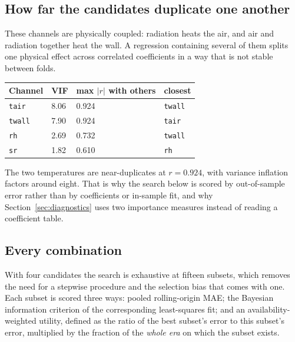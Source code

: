 \documentclass[11pt,a4paper]{article}
\begin{document}
\subsection{How far the candidates duplicate one another}
\label{sec:collinearity}

These channels are physically coupled: radiation heats the air, and air and
radiation together heat the wall. A regression containing several of them splits
one physical effect across correlated coefficients in a way that is not stable
between folds.

\begin{center}
\small
\begin{tabular}{lR{1.6cm}R{2.6cm}l}
\toprule
\textbf{Channel} & \textbf{VIF} & \textbf{max $|r|$ with others} &
\textbf{closest} \\
\midrule
\texttt{tair}  & 8.06 & 0.924 & \texttt{twall} \\
\texttt{twall} & 7.90 & 0.924 & \texttt{tair} \\
\texttt{rh}    & 2.69 & 0.732 & \texttt{twall} \\
\texttt{sr}    & 1.82 & 0.610 & \texttt{rh} \\
\bottomrule
\end{tabular}
\end{center}

The two temperatures are near-duplicates at $r = 0.924$, with variance inflation
factors around eight. That is why the search below is scored by out-of-sample
error rather than by coefficients or in-sample fit, and why
Section~\ref{sec:diagnostics} uses two importance measures instead of reading a
coefficient table.

\subsection{Every combination}

With four candidates the search is exhaustive at fifteen subsets, which removes
the need for a stepwise procedure and the selection bias that comes with one.
Each subset is scored three ways: pooled rolling-origin MAE; the Bayesian
information criterion of the corresponding least-squares fit; and an
availability-weighted utility, defined as the ratio of the best subset's error to
this subset's error, multiplied by the fraction of the \emph{whole era} on which
the subset exists.
\end{document}
